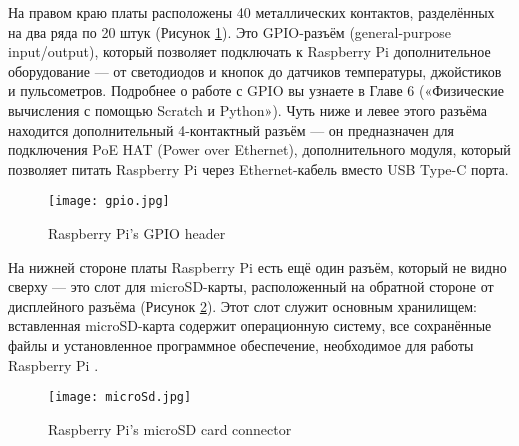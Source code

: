 На правом краю платы расположены 40 металлических контактов, разделённых на два ряда по 20 штук (Рисунок \ref{fig:gpio}). Это GPIO-разъём (general-purpose input/output), который позволяет подключать к Raspberry Pi дополнительное оборудование — от светодиодов и кнопок до датчиков температуры, джойстиков и пульсометров. Подробнее о работе с GPIO вы узнаете в Главе 6 («Физические вычисления с помощью Scratch и Python»).
Чуть ниже и левее этого разъёма находится дополнительный 4-контактный разъём — он предназначен для подключения PoE HAT (Power over Ethernet), дополнительного модуля, который позволяет питать Raspberry Pi через Ethernet-кабель вместо USB Type-C порта.

\begin{figure}[H]
	\centering
	\texttt{[image: gpio.jpg]}
	\caption{Raspberry Pi’s GPIO header}
	\label{fig:gpio}
\end{figure}

На нижней стороне платы Raspberry Pi есть ещё один разъём, который не видно сверху — это слот для microSD-карты, расположенный на обратной стороне от дисплейного разъёма (Рисунок \ref{fig:microSd}). Этот слот служит основным хранилищем: вставленная microSD-карта содержит операционную систему, все сохранённые файлы и установленное программное обеспечение, необходимое для работы Raspberry Pi \cite{RaspberryPi}.

\begin{figure}[H]
	\centering
	\texttt{[image: microSd.jpg]}
	\caption{Raspberry Pi’s microSD card connector}
	\label{fig:microSd}
\end{figure}
\newpage
